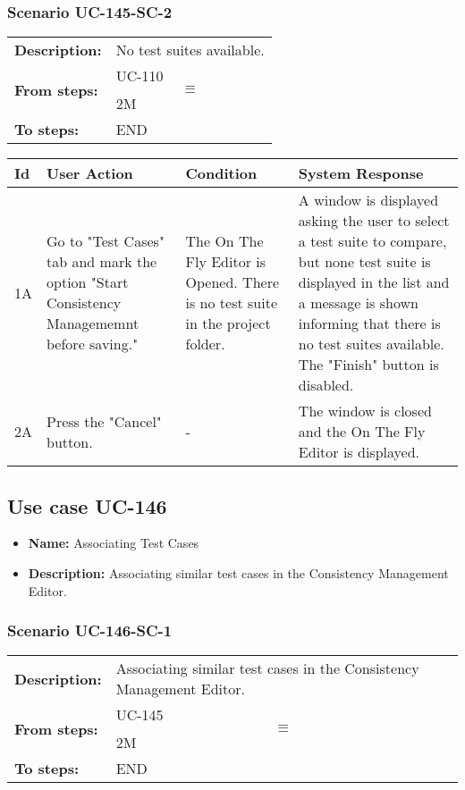 \documentclass[a4paper,11pt]{article}
\newcommand{\bl}{\\ \hline}
\begin{document}
\subsubsection*{Scenario UC-145-SC-2}
\begin{tabular}{p{1in}p{4in}}
{\bf Description:} & No test suites available. \\
{\bf From steps:} & UC-110$$\equiv$$2M \\
{\bf To steps:} & END \\
\end{tabular}
 
\begin{tabular}{|p{0.8in}|p{1.6in}|p{1.6in}|p{1.6in}|}
\hline
Id & User Action & Condition & System Response  \bl 
1A & Go to "Test Cases" tab and mark the option "Start Consistency Managememnt before saving." & The On The Fly Editor is Opened. There is no test suite in the project folder. & A window is displayed asking the user to select a test suite to compare, but none test suite is displayed in the list and a message is shown informing that there is no test suites available. The "Finish" button is disabled. \bl 
2A & Press the "Cancel" button. & - & The window is closed and the On The Fly Editor is displayed. \bl 
\end{tabular}
\subsection*{Use case UC-146}
\begin{itemize}
\item {\bf Name: }Associating Test Cases
\item {\bf Description: }Associating similar test cases in the Consistency Management Editor.
\end{itemize}
\subsubsection*{Scenario UC-146-SC-1}
\begin{tabular}{p{1in}p{4in}}
{\bf Description:} & Associating similar test cases in the Consistency Management Editor. \\
{\bf From steps:} & UC-145$$\equiv$$2M \\
{\bf To steps:} & END \\
\end{tabular}
 
\end{document}
